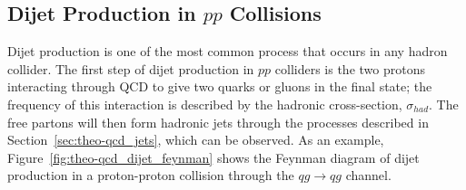 
\subsection{Dijet Production in $pp$ Collisions}
\label{sec:theo-qcd_dijet}


Dijet production is one of the most common process that occurs in any hadron collider.
The first step of dijet production in $pp$ colliders is the two protons interacting through QCD to give two quarks or gluons in the final state;
the frequency of this interaction is described by the hadronic cross-section, $\sigma_{had}$.
The free partons will then form hadronic jets through the processes described in Section~\ref{sec:theo-qcd_jets}, which can be observed.
As an example, Figure~\ref{fig:theo-qcd_dijet_feynman} shows the Feynman diagram of
dijet production in a proton-proton collision through the $qg \to qg$ channel.

